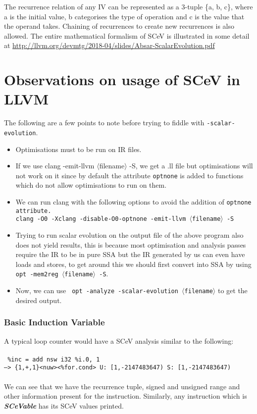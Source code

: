 \documentclass[12pt]{article}
\begin{document}
The recurrence relation of any IV can be represented as a 3-tuple \{a, b, c\}, where a is the initial value, b categorises the type of operation and c is the value that the operand takes. Chaining of recurrences to create new recurrences is also allowed. The entire mathematical formalism of SCeV is illustrated in some detail at \href{http://llvm.org/devmtg/2018-04/slides/Absar-ScalarEvolution.pdf}{http://llvm.org/devmtg/2018-04/slides/Absar-ScalarEvolution.pdf}

\section*{Observations on usage of SCeV in LLVM}

The following are a few points to note before trying to fiddle with \texttt{-scalar-evolution}.
\begin{itemize}
\item Optimisations must to be run on IR files.
\item If we use clang -emit-llvm $\langle$filename$\rangle$ -S, we get a .ll file but optimisations will not work on it since by default the attribute \texttt{optnone} is added to functions which do not allow optimisations to run on them.
\item We can run clang with the following options to avoid the addition of \texttt{optnone attribute.}\\
\texttt{clang -O0 -Xclang -disable-O0-optnone -emit-llvm $\langle$filename$\rangle$ -S}
\item Trying to run scalar evolution on the output file of the above program also does not yield results, this is because most optimisation and analysis passes require the IR to be in pure SSA but the IR generated by us can even have loads and stores, to get around this we should first convert into SSA by using \texttt{opt -mem2reg $\langle$filename$\rangle$ -S}.
\item Now, we can use \texttt{ opt -analyze -scalar-evolution $\langle$filename$\rangle$} to get the desired output.
\end{itemize}
\subsubsection*{Basic Induction Variable}
A typical loop counter would have a SCeV analysis similar to the following:\\\\
\texttt{ \%inc = add nsw i32 \%i.0, 1\\
  -->  \{1,+,1\}<nuw><\%for.cond> U: [1,-2147483647) S: [1,-2147483647)}\\\\
We can see that we have the recurrence tuple, signed and unsigned range and other information present for the instruction. Similarly, any instruction which is \textbf{\textit{SCeVable}} has its SCeV values printed.
\end{document}
